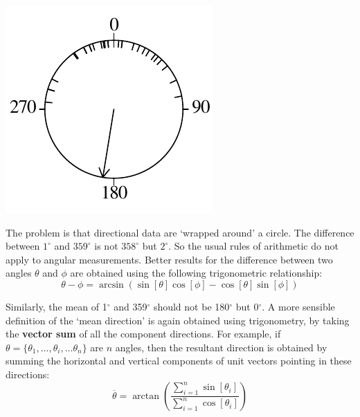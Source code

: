 \noindent\begin{minipage}[t][][b]{.25\textwidth}
\includegraphics[width=\textwidth]{../figures/circle2.pdf}\medskip
\end{minipage}
\begin{minipage}[t][][t]{.75\textwidth}
  \label{fig:circle2}
\end{minipage}

The problem is that directional data are `wrapped around' a circle.
The difference between $1^{\circ}$ and $359^{\circ}$ is not
$358^{\circ}$ but $2^{\circ}$. So the usual rules of arithmetic do not
apply to angular measurements. Better results for the difference
between two angles $\theta$ and $\phi$ are obtained using the
following trigonometric relationship:
\begin{equation}
  \theta - \phi = \arcsin\left( \sin[\theta] \cos[\phi] -
                                \cos[\theta] \sin[\phi] \right)
  \label{eq:anglediff}
\end{equation}

Similarly, the mean of 1$^\circ$ and 359$^\circ$ should not be
180$^\circ$ but 0$^\circ$. A more sensible definition of the `mean
direction' is again obtained using trigonometry, by taking the
\textbf{vector sum} of all the component directions. For example, if
$\theta = \{\theta_1, \ldots, \theta_i, \ldots \theta_n \}$ are $n$
angles, then the resultant direction is obtained by summing the
horizontal and vertical components of unit vectors pointing in these
directions:
\begin{equation}
  \overline{\theta} = \arctan\left(\frac{\sum_{i=1}^{n}
    \sin[\theta_i]}{\sum_{i=1}^{n}\cos[\theta_i]} \right)
  \label{eq:averagedirection}
\end{equation}

